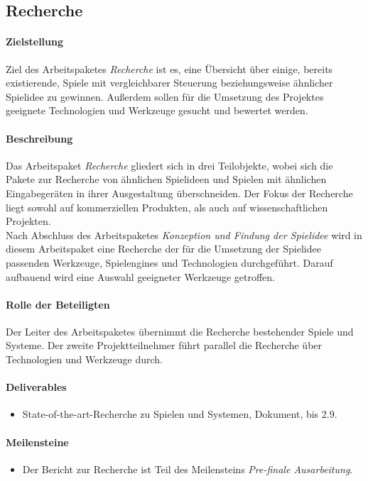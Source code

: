 \subsection{Recherche}
\label{ap3}

\paragraph{Zielstellung}\noindent
Ziel des Arbeitspaketes \textit{Recherche} ist es, eine Übersicht über einige, bereits existierende, Spiele mit vergleichbarer Steuerung beziehungsweise ähnlicher Spielidee zu gewinnen. Außerdem sollen für die Umsetzung des Projektes geeignete Technologien und Werkzeuge gesucht und bewertet werden.

\paragraph{Beschreibung}\noindent
Das Arbeitspaket \textit{Recherche} gliedert sich in drei Teilobjekte, wobei sich die Pakete zur Recherche von ähnlichen Spielideen und Spielen mit ähnlichen Eingabegeräten in ihrer Ausgestaltung überschneiden. Der Fokus der Recherche liegt sowohl auf kommerziellen Produkten, als auch auf wissenschaftlichen Projekten.\\
Nach Abschluss des Arbeitspaketes \textit{Konzeption und Findung der Spielidee} wird in diesem Arbeitspaket eine Recherche der für die Umsetzung der Spielidee passenden Werkzeuge, Spielengines und Technologien durchgeführt. Darauf aufbauend wird eine Auswahl geeigneter Werkzeuge getroffen.

\paragraph{Rolle der Beteiligten}\noindent
Der Leiter des Arbeitspaketes übernimmt die Recherche bestehender Spiele und Systeme. Der zweite Projektteilnehmer führt parallel die Recherche über Technologien und Werkzeuge durch.

\paragraph{Deliverables}\noindent
\begin{itemize}
\item State-of-the-art-Recherche zu Spielen und Systemen, Dokument, bis 2.9.
\end{itemize}

\paragraph{Meilensteine}\noindent
\begin{itemize}
\item Der Bericht zur Recherche ist Teil des Meilensteins \textit{Pre-finale Ausarbeitung}.
\end{itemize}
